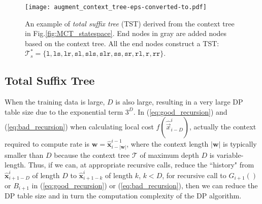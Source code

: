 \begin{figure}[tb]

\begin{minipage}[b]{1\linewidth}
  \centering
  \centerline{\texttt{[image: augment\_context\_tree-eps-converted-to.pdf]}}
  \centerline{}\medskip
\end{minipage}

\vspace{-0.3cm}
\caption{An example of \textit{total suffix tree} (TST) derived from the context tree in Fig.\;\ref{fig:MCT_statespace}. End nodes in gray are added nodes based on the context tree. All the end nodes construct a TST: $\mathcal{T}_s^{\ast}=\{\texttt{l},\texttt{ls},\texttt{lr},\texttt{sl},\texttt{sls},\texttt{slr},\texttt{ss},\texttt{sr},\texttt{rl},\texttt{r},\texttt{rr}\}$.}
\label{fig:suffix_tree}
\end{figure}


\subsection{Total Suffix Tree}
\label{subsec:algorithm_suffix}

When the training data is large, $D$ is also large, resulting in a very large DP table size due to the exponential term $3^D$.
In (\ref{eq:good_recursion}) and (\ref{eq:bad_recursion}) when calculating local cost $f(\hat{\vec{x}}_{i-D}^{i})$, actually the context required to compute rate is $\mathbf{w}=\hat{\mathbf{x}}_{i-|\mathbf{w}|}^{i-1}$, where the context length $|\mathbf{w}|$ is typically smaller than $D$ because the context tree $\mathcal{T}$ of maximum depth $D$ is variable-length.
Thus, if we can, at appropriate recursive calls, reduce the ``history" from $\hat{\mathbf{x}}^{i}_{i+1-D}$ of length $D$ to $\hat{\mathbf{x}}^{i}_{i+1-k}$ of length $k$, $k < D$, for recursive call to $G_{i+1}()$ or $B_{i+1}$ in (\ref{eq:good_recursion}) or (\ref{eq:bad_recursion}), then we can reduce the DP table size and in turn the computation complexity of the DP algorithm.

